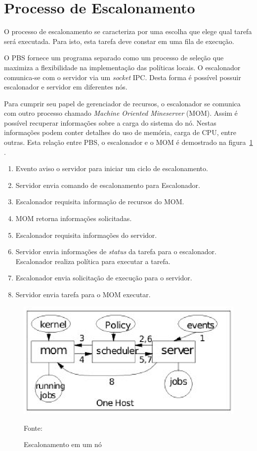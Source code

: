 \section{Processo de Escalonamento}

O processo de escalonamento se caracteriza por uma escolha que elege qual tarefa será executada. Para isto, esta tarefa deve constar em uma fila de execução.

O PBS fornece um programa separado como um processo de seleção que maximiza a flexibilidade na implementação das políticas locais. O escalonador comunica-se com o servidor via um \emph{socket} IPC. Desta forma é possível possuir escalonador e servidor em diferentes nós.

Para cumprir seu papel de gerenciador de recursos, o escalonador se comunica com outro processo chamado \emph{Machine Oriented Mineserver} (MOM). Assim é possível recuperar informações sobre a carga do sistema do nó. Nestas informações podem conter detalhes do uso de memória, carga de CPU, entre outras. Esta relação entre PBS, o escalonador e o MOM é demostrado na figura~\ref{fig:Pbs_MOM} \cite{Bayucan1998}.

\begin{center}
	\begin{enumerate}
		\item Evento aviso o servidor para iniciar um ciclo de escalonamento.
		\item Servidor envia comando de escalonamento para Escalonador.
		\item Escalonador requisita informação de recursos do MOM.
		\item MOM retorna informações solicitadas.
		\item Escalonador requisita informações do servidor.
		\item Servidor envia informações de \emph{status} da tarefa para o escalonador. Escalonador realiza política para executar a tarefa.
		\item Escalonador envia solicitação de execução para o servidor.
		\item Servidor envia tarefa para o MOM executar.
	\end{enumerate}
\end{center}

\begin{figure}[htb]
\begin{center}
\includegraphics[scale=0.9]{./img/PbsMom.eps}
\caption{Escalonamento em um nó}
\label{fig:Pbs_MOM}
Fonte: \cite{Bayucan1998}
\end{center}
\end{figure}

